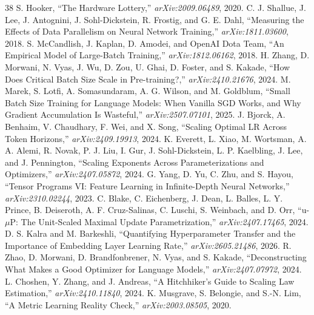 \begin{thebibliography}{38}
 S. Hooker, ``The Hardware Lottery,'' \emph{arXiv:2009.06489}, 2020.
 C. J. Shallue, J. Lee, J. Antognini, J. Sohl-Dickstein, R. Frostig, and G. E. Dahl, ``Measuring the Effects of Data Parallelism on Neural Network Training,'' \emph{arXiv:1811.03600}, 2018.
 S. McCandlish, J. Kaplan, D. Amodei, and OpenAI Dota Team, ``An Empirical Model of Large-Batch Training,'' \emph{arXiv:1812.06162}, 2018.
 H. Zhang, D. Morwani, N. Vyas, J. Wu, D. Zou, U. Ghai, D. Foster, and S. Kakade, ``How Does Critical Batch Size Scale in Pre-training?,'' \emph{arXiv:2410.21676}, 2024.
 M. Marek, S. Lotfi, A. Somasundaram, A. G. Wilson, and M. Goldblum, ``Small Batch Size Training for Language Models: When Vanilla SGD Works, and Why Gradient Accumulation Is Wasteful,'' \emph{arXiv:2507.07101}, 2025.
 J. Bjorck, A. Benhaim, V. Chaudhary, F. Wei, and X. Song, ``Scaling Optimal LR Across Token Horizons,'' \emph{arXiv:2409.19913}, 2024.
 K. Everett, L. Xiao, M. Wortsman, A. A. Alemi, R. Novak, P. J. Liu, I. Gur, J. Sohl-Dickstein, L. P. Kaelbling, J. Lee, and J. Pennington, ``Scaling Exponents Across Parameterizations and Optimizers,'' \emph{arXiv:2407.05872}, 2024.
 G. Yang, D. Yu, C. Zhu, and S. Hayou, ``Tensor Programs VI: Feature Learning in Infinite-Depth Neural Networks,'' \emph{arXiv:2310.02244}, 2023.
 C. Blake, C. Eichenberg, J. Dean, L. Balles, L. Y. Prince, B. Deiseroth, A. F. Cruz-Salinas, C. Luschi, S. Weinbach, and D. Orr, ``u-$\mu$P: The Unit-Scaled Maximal Update Parametrization,'' \emph{arXiv:2407.17465}, 2024.
 D. S. Kalra and M. Barkeshli, ``Quantifying Hyperparameter Transfer and the Importance of Embedding Layer Learning Rate,'' \emph{arXiv:2605.21486}, 2026.
 R. Zhao, D. Morwani, D. Brandfonbrener, N. Vyas, and S. Kakade, ``Deconstructing What Makes a Good Optimizer for Language Models,'' \emph{arXiv:2407.07972}, 2024.
 L. Choshen, Y. Zhang, and J. Andreas, ``A Hitchhiker's Guide to Scaling Law Estimation,'' \emph{arXiv:2410.11840}, 2024.
 K. Musgrave, S. Belongie, and S.-N. Lim, ``A Metric Learning Reality Check,'' \emph{arXiv:2003.08505}, 2020.
\end{thebibliography}
